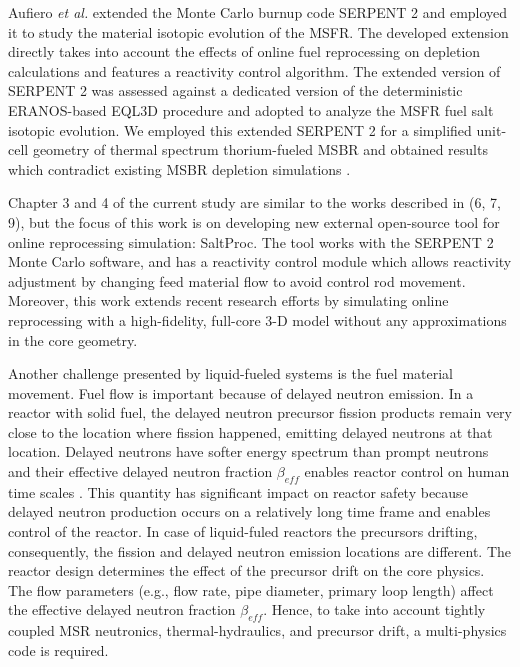 Aufiero \emph{et al.} extended the Monte Carlo burnup code SERPENT 2 and employed it to study the material isotopic evolution of the \gls{MSFR}. The developed extension directly takes into account the effects of online fuel reprocessing on depletion calculations and features a reactivity control algorithm. The extended version of SERPENT 2 was assessed against a dedicated version of the deterministic ERANOS-based EQL3D procedure \cite{ruggieri_eranos_2006} and adopted to analyze the \gls{MSFR} fuel salt isotopic evolution. We employed this extended SERPENT 2 for a simplified unit-cell geometry of thermal spectrum thorium-fueled \gls{MSBR} and obtained results which contradict existing \gls{MSBR} depletion simulations \cite{jeong_equilibrium_2016}.

Chapter 3 and 4 of the current study are similar to the works described in (6, 7, 9), but the focus of this work is on developing new external open-source tool for online reprocessing simulation: SaltProc. The tool works with the SERPENT 2 Monte Carlo software, and has a reactivity control module which allows reactivity adjustment by changing feed material flow to avoid control rod movement. Moreover, this work extends recent research efforts by simulating online reprocessing with a high-fidelity, full-core 3-D model without any approximations in the core geometry.

Another challenge presented by liquid-fueled systems is the fuel material movement. Fuel flow is important because of delayed neutron emission. In a reactor with solid fuel, the delayed neutron precursor fission products remain very close to the location where fission happened, emitting delayed neutrons at that location. Delayed neutrons have softer energy spectrum than prompt neutrons and their effective delayed neutron fraction $\beta_{eff}$ enables reactor control on human time scales \cite{betzler_molten_2017}. This quantity has significant impact on reactor safety because delayed neutron production occurs on a relatively long time frame and enables control of the reactor. In case of liquid-fuled reactors the precursors drifting, consequently, the fission and delayed neutron emission locations are different. The reactor design determines the effect of the precursor drift on the core physics. The flow parameters (e.g., flow rate, pipe diameter, primary loop length) affect the effective delayed neutron fraction $\beta_{eff}$. Hence, to take into account tightly coupled \gls{MSR} neutronics, thermal-hydraulics, and precursor drift, a multi-physics code is required.

